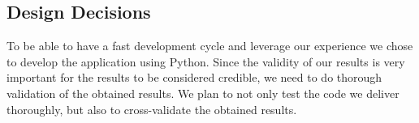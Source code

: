\subsection{Design Decisions}
To be able to have a fast development cycle and leverage our experience we chose to develop the application using Python. 
Since the validity of our results is very important for the results to be considered credible, we need to do thorough validation of the obtained results. We plan to not only test the code we deliver thoroughly, but also to cross-validate the obtained results.